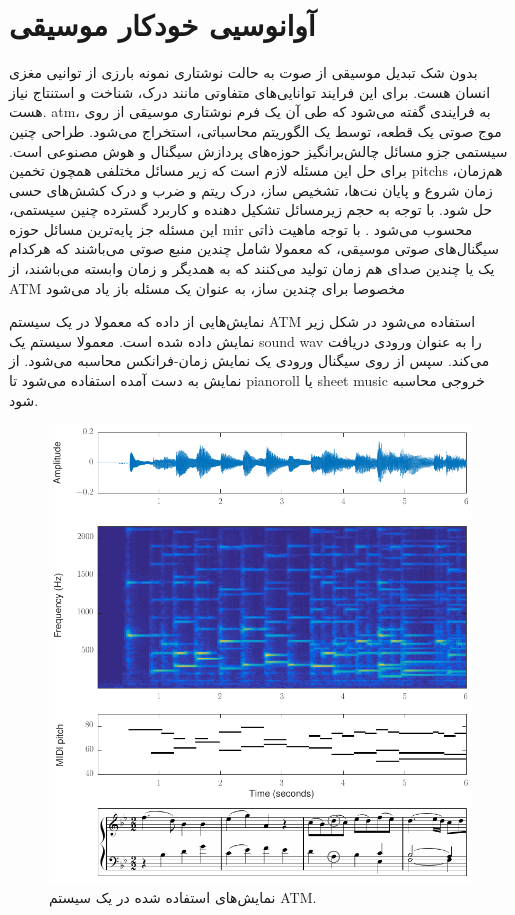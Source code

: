 \section{آوانوسیی خودکار موسیقی}
بدون شک تبدیل موسیقی از صوت به حالت نوشتاری نمونه بارزی از توانیی مغزی انسان
هست. برای این فرایند توانایی‌های متفاوتی مانند درک، شناخت و استنتاج نیاز هست.
\gls{atm}، به فرایندی گفته می‌شود که طی آن یک فرم نوشتاری موسیقی از روی موج صوتی
یک قطعه، توسط یک الگوریتم محاسباتی، استخراج می‌شود. طراحی چنین سیستمی جزو مسائل
چالش‌برانگیز حوزه‌های پردازش سیگنال و هوش مصنوعی است. برای حل این مسئله لازم است
که زیر مسائل مختلفی همچون تخمین \glspl{pitch} هم‌زمان، زمان شروع و پایان نت‌ها،
تشخیص ساز، درک ریتم و ضرب و درک کشش‌های حسی حل شود. با توجه به حجم زیرمسائل
تشکیل دهنده و کاربرد گسترده چنین سیستمی، این مسئله جز پایه‌ترین مسائل حوزه
\gls{mir} محسوب می‌شود \cite{klapuri2007signal,benetos2013automatic}. با توجه
ماهیت ذاتی سیگنال‌های صوتی موسیقی، که معمولا شامل چندین منبع صوتی می‌باشند که
هرکدام یک یا چندین صدای هم زمان تولید می‌کنند که به همدیگر و زمان وابسته
می‌باشند، از \gls{ATM} مخصوصا برای چندین ساز، به عنوان یک مسئله باز یاد می‌شود
\cite{benetos2013automatic}

نمایش‌هایی از داده که معمولا در یک سیستم \gls{ATM} استفاده می‌شود در شکل زیر
نمایش داده شده است. معمولا سیستم یک \gls{sound wav} را به عنوان ورودی دریافت
می‌کند. سپس از روی سیگنال ورودی یک نمایش زمان-فرانکس محاسبه می‌شود. از نمایش به
دست آمده استفاده می‌شود تا \gls{pianoroll} یا \gls{sheet music} خروجی محاسبه
شود.
\begin{figure}[]
    \centering
    \includegraphics[width=12cm]{./statics/atm_data.png}
    \caption{نمایش‌های استفاده شده در یک سیستم \gls{ATM}.}
\end{figure}

